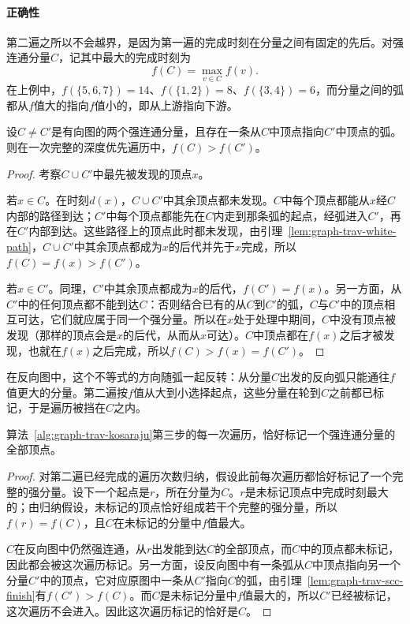 \paragraph{正确性}
第二遍之所以不会越界，是因为第一遍的完成时刻在分量之间有固定的先后。对强连通分量$C$，记其中最大的完成时刻为
\[
f(C)=\max_{v\in C}f(v).
\]
在上例中，$f(\{5,6,7\})=14$、$f(\{1,2\})=8$、$f(\{3,4\})=6$，而分量之间的弧都从$f$值大的指向$f$值小的，即从上游指向下游。

\begin{lemma}[分量间的完成时刻]
\label{lem:graph-trav-scc-finish}
设$C\neq C'$是有向图的两个强连通分量，且存在一条从$C$中顶点指向$C'$中顶点的弧。则在一次完整的深度优先遍历中，$f(C)>f(C')$。
\end{lemma}

\begin{proof}
考察$C\cup C'$中最先被发现的顶点$x$。

若$x\in C$。在时刻$d(x)$，$C\cup C'$中其余顶点都未发现。$C$中每个顶点都能从$x$经$C$内部的路径到达；$C'$中每个顶点都能先在$C$内走到那条弧的起点，经弧进入$C'$，再在$C'$内部到达。这些路径上的顶点此时都未发现，由引理~\ref{lem:graph-trav-white-path}，$C\cup C'$中其余顶点都成为$x$的后代并先于$x$完成，所以$f(C)=f(x)>f(C')$。

若$x\in C'$。同理，$C'$中其余顶点都成为$x$的后代，$f(C')=f(x)$。另一方面，从$C'$中的任何顶点都不能到达$C$：否则结合已有的从$C$到$C'$的弧，$C$与$C'$中的顶点相互可达，它们就应属于同一个强分量。所以在$x$处于处理中期间，$C$中没有顶点被发现（那样的顶点会是$x$的后代，从而从$x$可达）。$C$中顶点都在$f(x)$之后才被发现，也就在$f(x)$之后完成，所以$f(C)>f(x)=f(C')$。
\end{proof}

在反向图中，这个不等式的方向随弧一起反转：从分量$C$出发的反向弧只能通往$f$值更大的分量。第二遍按$f$值从大到小选择起点，这些分量在轮到$C$之前都已标记，于是遍历被挡在$C$之内。

\begin{theorem}[Kosaraju算法的正确性]
\label{thm:graph-trav-kosaraju}
算法~\ref{alg:graph-trav-kosaraju}第三步的每一次遍历，恰好标记一个强连通分量的全部顶点。
\end{theorem}

\begin{proof}
对第二遍已经完成的遍历次数归纳，假设此前每次遍历都恰好标记了一个完整的强分量。设下一个起点是$r$，所在分量为$C$。$r$是未标记顶点中完成时刻最大的；由归纳假设，未标记的顶点恰好组成若干个完整的强分量，所以$f(r)=f(C)$，且$C$在未标记的分量中$f$值最大。

$C$在反向图中仍然强连通，从$r$出发能到达$C$的全部顶点，而$C$中的顶点都未标记，因此都会被这次遍历标记。另一方面，设反向图中有一条弧从$C$中顶点指向另一个分量$C'$中的顶点，它对应原图中一条从$C'$指向$C$的弧，由引理~\ref{lem:graph-trav-scc-finish}有$f(C')>f(C)$。而$C$是未标记分量中$f$值最大的，所以$C'$已经被标记，这次遍历不会进入。因此这次遍历标记的恰好是$C$。
\end{proof}


